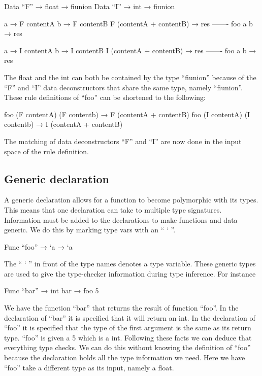 \begin{code}
	Data “F” → float → fiunion
	Data “I” → int → fiunion
	
	a → F contentA
	b → F contentB
	F (contentA + contentB) → res
	-------
	foo a b → res
	
	a → I contentA
	b → I contentB
	I (contentA + contentB) → res
	-------
	foo a b → res
\end{code}

The float and the int can both be contained by the type “fiunion” because of the “F” and “I” data deconstructors that share the same type, namely “fiunion”.
\linebreak
These rule definitions of “foo” can be shortened to the following:


\begin{code}
	foo (F contentA) (F contentb) → F (contentA + contentB)
	foo (I contentA) (I contentb) → I (contentA + contentB)
\end{code}

The matching of data deconstructors “F” and “I” are now done in the input space of the rule definition.

\subsection{Generic declaration}

A generic declaration allows for a function to become polymorphic with its types. 
This means that one declaration can take to multiple type signatures.
\linebreak
Information must be added to the declarations to make functions and data generic. 
We do this by marking type vars with an “ ` ”.

\begin{code}
	Func “foo” → `a → `a
\end{code}

The “ ` ” in front of the type names denotes a type variable. 
These generic types are used to give the type-checker information during type inference. 
For instance


\begin{code}
	Func “bar” → int
	bar → foo 5
\end{code}

We have the function “bar” that returns the result of function “foo”. 
In the declaration of “bar” it is specified that it will return an int. 
In the declaration of “foo” it is specified that the type of the first argument is the same as its return type. 
“foo” is given a 5 which is a int. 
Following these facts we can deduce that everything type checks. 
We can do this without knowing the definition of “foo” because the declaration holds all the type information we need.
\linebreak
Here we have “foo” take a different type as its input, namely a float.

